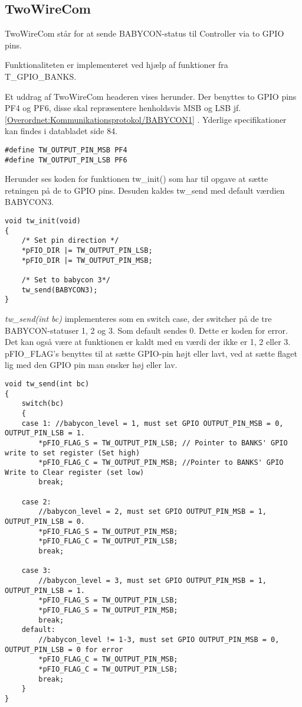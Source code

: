 \subsection*{TwoWireCom}
TwoWireCom står for at sende BABYCON-status til Controller via to GPIO pins. 

Funktionaliteten er implementeret ved hjælp af funktioner fra T\_GPIO\_BANKS. 

Et uddrag af TwoWireCom headeren vises herunder.
Der benyttes to GPIO pins PF4 og PF6, disse skal repræsentere henholdsvis MSB og LSB jf. \ref{Overordnet:Kommunikationsprotokol/BABYCON1} . Yderlige specifikationer kan findes i databladet \citep{AD1836} side 84. 

\begin{verbatim}
#define TW_OUTPUT_PIN_MSB PF4
#define TW_OUTPUT_PIN_LSB PF6
\end{verbatim}

Herunder ses koden for funktionen tw\_init() som har til opgave at sætte retningen på de to GPIO pins. Desuden kaldes tw\_send med default værdien BABYCON3. 
\begin{verbatim}
void tw_init(void)
{
    /* Set pin direction */
    *pFIO_DIR |= TW_OUTPUT_PIN_LSB;
    *pFIO_DIR |= TW_OUTPUT_PIN_MSB;

    /* Set to babycon 3*/
    tw_send(BABYCON3);
}
\end{verbatim}

\textit{tw\_send(int bc)} implementeres som en switch case, der switcher på de tre BABYCON-statuser 1, 2 og 3. Som default sendes 0. Dette er koden for error. Det kan også være at funktionen er kaldt med en værdi der ikke er 1, 2 eller 3.  
pFIO\_FLAG's benyttes til at sætte GPIO-pin højt eller lavt, ved at sætte flaget lig med den GPIO pin man ønsker høj eller lav. 

\begin{verbatim}
void tw_send(int bc)
{
    switch(bc)
    {
    case 1:	//babycon_level = 1, must set GPIO OUTPUT_PIN_MSB = 0, OUTPUT_PIN_LSB = 1.
        *pFIO_FLAG_S = TW_OUTPUT_PIN_LSB; // Pointer to BANKS' GPIO write to set register (Set high)
        *pFIO_FLAG_C = TW_OUTPUT_PIN_MSB; //Pointer to BANKS' GPIO Write to Clear register (set low)
        break;

    case 2:
        //babycon_level = 2, must set GPIO OUTPUT_PIN_MSB = 1, OUTPUT_PIN_LSB = 0.
        *pFIO_FLAG_S = TW_OUTPUT_PIN_MSB;
        *pFIO_FLAG_C = TW_OUTPUT_PIN_LSB;
        break;

    case 3:
        //babycon_level = 3, must set GPIO OUTPUT_PIN_MSB = 1, OUTPUT_PIN_LSB = 1.
        *pFIO_FLAG_S = TW_OUTPUT_PIN_LSB;
        *pFIO_FLAG_S = TW_OUTPUT_PIN_MSB;
        break;
    default:
        //babycon_level != 1-3, must set GPIO OUTPUT_PIN_MSB = 0, OUTPUT_PIN_LSB = 0 for error
        *pFIO_FLAG_C = TW_OUTPUT_PIN_MSB;
        *pFIO_FLAG_C = TW_OUTPUT_PIN_LSB;
        break;
    }
}
\end{verbatim}